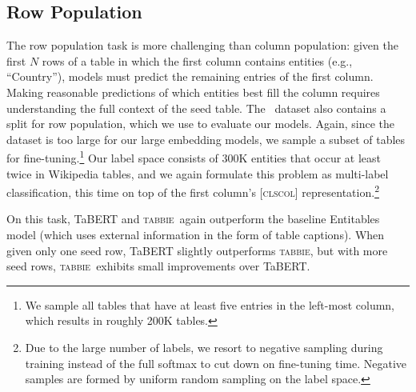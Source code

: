 \documentclass[11pt]{article}
\newcommand{\name}[0]{\textsc{tabbie}}
\begin{document}
\subsection{Row Population}
The row population task is more challenging than column population: given the first $N$ rows of a table in which the first column contains entities (e.g., ``Country''), models must predict the remaining entries of the first column. Making reasonable predictions of which entities best fill the column requires understanding the full context of the seed table.
The~\citet{entitables} dataset also contains a split for row population, which we use to evaluate our models. Again, since the dataset is too large for our large embedding models, we sample a subset of tables for fine-tuning.\footnote{We sample all tables that have at least five entries in the left-most column, which results in roughly 200K tables.} Our label space consists of 300K entities that occur at least twice in Wikipedia tables, and we again formulate this problem as multi-label classification, this time on top of the first column's \textsc{[clscol]} representation.\footnote{Due to the large number of labels, we resort to negative sampling during training instead of the full softmax to cut down on fine-tuning time. Negative samples are formed by uniform random sampling on the label space.} 



On this task, TaBERT and \name\ again outperform the baseline Entitables model (which uses external information in the form of table captions). When given only one seed row, TaBERT slightly outperforms \name, but with more seed rows, \name\ exhibits small improvements over TaBERT. 
\end{document}
